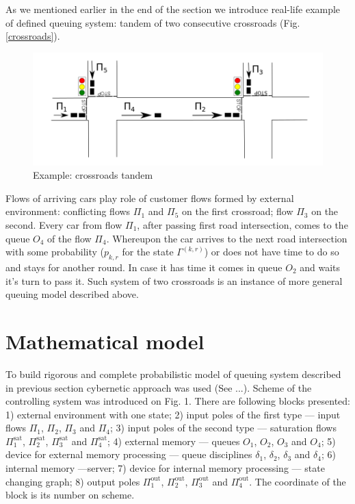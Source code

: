 \documentclass[10pt]{article}
\begin{document}
As we mentioned earlier in the end of the section we introduce real-life example of defined queuing system: tandem of two consecutive crossroads (Fig. \ref{crossroads}). 
\begin{figure}[h!]
   \centering
    \includegraphics[width=\textwidth]{Crossroads.png} %
    \caption {Example: crossroads tandem}
    \label{pic1}
\end{figure}
Flows of arriving cars play role of customer flows formed by external environment: conflicting flows $\Pi_1$ and $\Pi_5$ on the first crossroad; flow $\Pi_3$ on the second. Every car from flow $\Pi_1$, after passing first road intersection, comes to the queue $O_4$ of the flow $\Pi_4$. Whereupon the car arrives to the next road intersection with some probability ($p_{k,r}$ for the state $\Gamma^{(k,r)}$) or does not have time to do so and stays for another round. In case it has time it comes in queue $O_2$ and waits it's turn to pass it. Such system of two crossroads is an instance of more general queuing model described above.

\section{Mathematical model}
To build rigorous and complete probabilistic model of queuing system described in previous section cybernetic approach was used (See ...). Scheme of the controlling system was introduced on Fig. 1. There are following blocks presented: 1) external environment with one state; 2) input poles of the first type --- input flows $\Pi_1$, $\Pi_2$, $\Pi_3$ and $\Pi_4$; 3) input poles of the second type --- saturation flows $\Pi^{\mathrm{\text{sat}}}_1$, $\Pi^{\mathrm{\text{sat}}}_2$, $\Pi^{\mathrm{\text{sat}}}_3$ and $\Pi^{\mathrm{\text{sat}}}_4$; 4) external memory --- queues $O_1$, $O_2$, $O_3$ and $O_4$; 5) device for external memory processing --- queue disciplines $\delta_1$, $\delta_2$, $\delta_3$ and $\delta_4$; 6) internal memory ---server; 7)  device for internal memory processing --- state changing graph; 8) output poles $\Pi^{\mathrm{\text{out}}}_1$, $\Pi^{\mathrm{\text{out}}}_2$, $\Pi^{\mathrm{\text{out}}}_3$ and $\Pi^{\mathrm{\text{out}}}_4$.
The coordinate of the block is its number on scheme.
\end{document}
